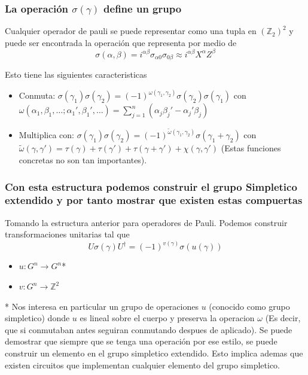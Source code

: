 \documentclass[english,9pt]{Linnaeus}
\begin{document}
\begin{frame}[allowframebreaks]
  \frametitle{La operación $\sigma(\gamma)$ define un grupo}
  Cualquier operador de pauli se puede representar como una tupla en $(\mathbb{Z}_2)^2$ y puede ser encontrada la operación que representa por medio de
  \begin{equation}
    \sigma(\alpha, \beta) = i^{\alpha\beta} \sigma_{\alpha 0}\sigma_{0 \beta} \approx i^{\alpha\beta} X^\alpha Z^\beta
    \label{eq:sigma}
  \end{equation}

  Esto tiene las siguientes caracteristicas
  \begin{itemize}
    \item Conmuta: $\sigma(\gamma_1)\sigma(\gamma_2) = (-1)^{\omega(\gamma_1, \gamma_2)} \sigma(\gamma_2)\sigma(\gamma_1)$ con $\omega(\alpha_1, \beta_1, \ldots; \alpha_1', \beta_1', \ldots) = \sum_{j = 1}^n (\alpha_j \beta_j' - \alpha_j'\beta_j)$
    \item Multiplica con: $\sigma(\gamma_1)\sigma(\gamma_2) = (-1)^{\tilde{\omega}(\gamma_1, \gamma_2)} \sigma(\gamma_1 + \gamma_2)$ con $\tilde{\omega}(\gamma, \gamma') = \tau(\gamma) + \tau(\gamma') + \tau(\gamma + \gamma') + \chi(\gamma, \gamma')$ (Estas funciones concretas no son tan importantes).
  \end{itemize}
\end{frame}

\begin{frame}
  \frametitle{Con esta estructura podemos construir el grupo Simpletico extendido y por tanto mostrar que existen estas compuertas}

  Tomando la estructura anterior para operadores de Pauli. Podemos construir transformaciones unitarias tal que
  \begin{equation}
    U \sigma(\gamma) U^\dagger = (-1)^{v(\gamma)}\sigma(u(\gamma))
    \label{eq:ESp2}
  \end{equation}
  \begin{itemize}
    \item $u : G^n \to G^n$*
    \item $v : G^n \to \mathbb{Z}^2$
  \end{itemize}

  \tiny{* Nos interesa en particular un grupo de operaciones $u$ (conocido como grupo simpletico) donde $u$ es lineal sobre el cuerpo y preserva la operacion $\omega$ (Es decir, que si conmutaban antes seguiran conmutando despues de aplicado). Se puede demostrar que siempre que se tenga una operación por ese estilo, se puede construir un elemento en el grupo simpletico extendido. Esto implica ademas que existen circuitos que implementan cualquier elemento del grupo simpletico.}
\end{frame}
\end{document}
